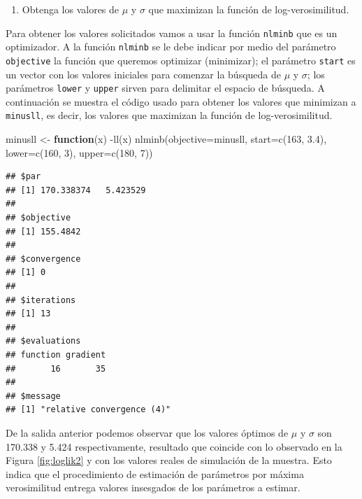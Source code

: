 \documentclass[
]{book}
\makeatletter
\newenvironment{Shaded}{\begin{snugshade}}{\end{snugshade}}
\newcommand{\AttributeTok}[1]{\textcolor[rgb]{0.77,0.63,0.00}{#1}}
\newcommand{\ControlFlowTok}[1]{\textcolor[rgb]{0.13,0.29,0.53}{\textbf{#1}}}
\newcommand{\DecValTok}[1]{\textcolor[rgb]{0.00,0.00,0.81}{#1}}
\newcommand{\FloatTok}[1]{\textcolor[rgb]{0.00,0.00,0.81}{#1}}
\newcommand{\FunctionTok}[1]{\textcolor[rgb]{0.00,0.00,0.00}{#1}}
\newcommand{\NormalTok}[1]{#1}
\newcommand{\OtherTok}[1]{\textcolor[rgb]{0.56,0.35,0.01}{#1}}
\newcommand{\SpecialCharTok}[1]{\textcolor[rgb]{0.00,0.00,0.00}{#1}}
\providecommand{\tightlist}{%
  \setlength{\itemsep}{0pt}\setlength{\parskip}{0pt}}
\newenvironment{kframe}{%
\medskip{}
\setlength{\fboxsep}{.8em}
 \def\at@end@of@kframe{}%
 \ifinner\ifhmode%
  \def\at@end@of@kframe{\end{minipage}}%
  \begin{minipage}{\columnwidth}%
 \fi\fi%
 \def\FrameCommand##1{\hskip\@totalleftmargin \hskip-\fboxsep
 \colorbox{shadecolor}{##1}\hskip-\fboxsep
     \hskip-\linewidth \hskip-\@totalleftmargin \hskip\columnwidth}%
 \MakeFramed {\advance\hsize-\width
   \@totalleftmargin\z@ \linewidth\hsize
   \@setminipage}}%
 {\par\unskip\endMakeFramed%
 \at@end@of@kframe}
\renewenvironment{Shaded}{\begin{kframe}}{\end{kframe}}
\makeatother
\begin{document}
\begin{enumerate}
\def\labelenumi{\arabic{enumi})}
\setcounter{enumi}{2}
\tightlist
\item
  Obtenga los valores de \(\mu\) y \(\sigma\) que maximizan la función de log-verosimilitud.
\end{enumerate}

Para obtener los valores solicitados vamos a usar la función \texttt{nlminb} que es un optimizador. A la función \texttt{nlminb} se le debe indicar por medio del parámetro \texttt{objective} la función que queremos optimizar (minimizar); el parámetro \texttt{start} es un vector con los valores iniciales para comenzar la búsqueda de \(\mu\) y \(\sigma\); los parámetros \texttt{lower} y \texttt{upper} sirven para delimitar el espacio de búsqueda. A continuación se muestra el código usado para obtener los valores que minimizan a \texttt{minusll}, es decir, los valores que maximizan la función de log-verosimilitud. 

\begin{Shaded}
\begin{Highlighting}[]
\NormalTok{minusll }\OtherTok{\textless{}{-}} \ControlFlowTok{function}\NormalTok{(x) }\SpecialCharTok{{-}}\FunctionTok{ll}\NormalTok{(x)}
\FunctionTok{nlminb}\NormalTok{(}\AttributeTok{objective=}\NormalTok{minusll, }\AttributeTok{start=}\FunctionTok{c}\NormalTok{(}\DecValTok{163}\NormalTok{, }\FloatTok{3.4}\NormalTok{),}
       \AttributeTok{lower=}\FunctionTok{c}\NormalTok{(}\DecValTok{160}\NormalTok{, }\DecValTok{3}\NormalTok{), }\AttributeTok{upper=}\FunctionTok{c}\NormalTok{(}\DecValTok{180}\NormalTok{, }\DecValTok{7}\NormalTok{))}
\end{Highlighting}
\end{Shaded}

\begin{verbatim}
## $par
## [1] 170.338374   5.423529
## 
## $objective
## [1] 155.4842
## 
## $convergence
## [1] 0
## 
## $iterations
## [1] 13
## 
## $evaluations
## function gradient 
##       16       35 
## 
## $message
## [1] "relative convergence (4)"
\end{verbatim}

De la salida anterior podemos observar que los valores óptimos de \(\mu\) y \(\sigma\) son 170.338 y 5.424 respectivamente, resultado que coincide con lo observado en la Figura \ref{fig:loglik2} y con los valores reales de simulación de la muestra. Esto indica que el procedimiento de estimación de parámetros por máxima verosimilitud entrega valores insesgados de los parámetros a estimar.
\end{document}
